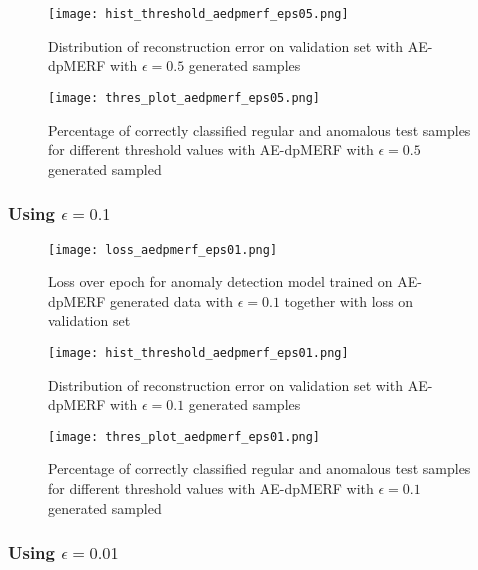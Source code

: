 \begin{figure}[h]
    \begin{minipage}[b]{0.45\textwidth}
        \centering
        \texttt{[image: hist\_threshold\_aedpmerf\_eps05.png]}
        \caption{Distribution of reconstruction error on validation set with AE-dpMERF with $\epsilon=0.5$ generated samples}
    
    \end{minipage}
    \begin{minipage}[b]{0.45\textwidth}
        \centering
        \texttt{[image: thres\_plot\_aedpmerf\_eps05.png]}
        \caption{Percentage of correctly classified regular and anomalous test samples for different threshold values with AE-dpMERF with $\epsilon=0.5$ generated sampled}
        \label{fig:thres_aegwan}
    \end{minipage}
\end{figure}

\subsubsection*{Using $\epsilon=0.1$}

\begin{figure}[H]
    \centering
    \texttt{[image: loss\_aedpmerf\_eps01.png]}
    \caption{Loss over epoch for anomaly detection model trained on AE-dpMERF generated data with $\epsilon=0.1$ together with loss on validation set}
\end{figure}

\begin{figure}[h]
    \begin{minipage}[b]{0.45\textwidth}
        \centering
        \texttt{[image: hist\_threshold\_aedpmerf\_eps01.png]}
        \caption{Distribution of reconstruction error on validation set with AE-dpMERF with $\epsilon=0.1$ generated samples}
    
    \end{minipage}
    \begin{minipage}[b]{0.45\textwidth}
        \centering
        \texttt{[image: thres\_plot\_aedpmerf\_eps01.png]}
        \caption{Percentage of correctly classified regular and anomalous test samples for different threshold values with AE-dpMERF with $\epsilon=0.1$ generated sampled}
        \label{fig:thres_aegwan}
    \end{minipage}
\end{figure}

\subsubsection*{Using $\epsilon=0.01$}


